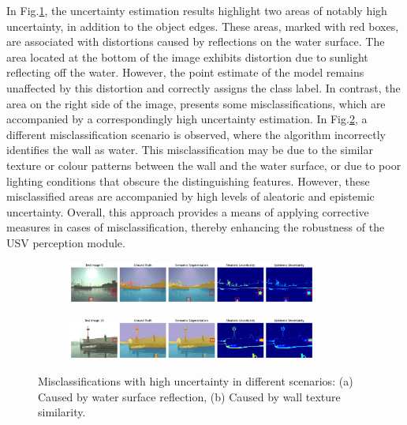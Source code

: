 In Fig.\ref{fig:error1}, the uncertainty estimation results highlight two areas of notably high 
uncertainty, in addition to the object edges. These areas, marked with red boxes, are associated with distortions 
caused by reflections on the water surface. The area located at the bottom of the image exhibits distortion due 
to sunlight reflecting off the water. However, the point estimate of the model remains unaffected by this distortion 
and correctly assigns the class label. In contrast, the area on the right side of the image, presents some 
misclassifications, which are accompanied by a correspondingly high uncertainty estimation. In Fig.\ref{fig:error2}, 
a different misclassification scenario is observed, where the algorithm incorrectly identifies the wall as water. 
This misclassification may be due to the similar texture or colour patterns between the wall and the water surface, 
or due to poor lighting conditions that obscure the distinguishing features. However, these misclassified areas are 
accompanied by high levels of aleatoric and epistemic uncertainty. Overall, this approach provides a means of applying 
corrective measures in cases of misclassification, thereby enhancing the robustness of the USV perception module. 
\begin{figure}[ht!]
    \centering
    \begin{subfigure}[h]{\textwidth}
        \centering
        \includegraphics[width=0.9\textwidth]{figures/MaSTr1325/errorness1.png}
        \caption{}
        \label{fig:error1}
    \end{subfigure}
    \centering
    \begin{subfigure}[h]{\textwidth}
        \centering
        \includegraphics[width=0.9\textwidth]{figures/MaSTr1325/errorness2.png}
        \caption{}
        \label{fig:error2}
    \end{subfigure}
    \caption{Misclassifications with high uncertainty in different scenarios: 
    (a) Caused by water surface reflection, (b) Caused by wall texture similarity.}
    \label{fig:high-uncertainty}
\end{figure}

